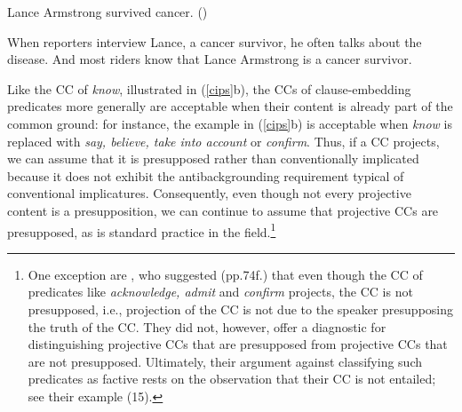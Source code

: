 \documentclass[11pt,fleqn]{article}
\def\infelic{{\leavevmode\llap{\#}}}
\newcommand{\6}{\mbox{$[\hspace*{-.6mm}[$}}
\newcommand{\9}{\mbox{$]\hspace*{-.6mm}]$}}
\begin{document}
\begin{exe}
\ex\label{cips} Lance Armstrong survived cancer. \hfill (\citealt[34]{potts05})
\begin{xlist}
\ex \infelic When reporters interview Lance, a cancer survivor, he often talks about the disease.
\ex And most riders know that Lance Armstrong is a cancer survivor.  
\end{xlist}
\end{exe}
Like the CC of {\em know}, illustrated in (\ref{cips}b), the CCs of clause-embedding predicates more generally are acceptable when their content is already part of the common ground: for instance, the example in (\ref{cips}b) is acceptable when {\em know} is replaced with {\em say, believe, take into account} or {\em confirm}. Thus, if a CC projects, we can assume that it is presupposed rather than conventionally implicated because it does not exhibit the antibackgrounding requirement typical of conventional implicatures. Consequently, even though not every projective content is a presupposition, we can continue to assume that projective CCs are presupposed, as is standard practice in the field.\footnote{One exception are \citet{anand-hacquard2014}, who suggested (pp.74f.) that even though the CC of predicates like {\em acknowledge, admit} and {\em confirm} projects, the CC is not presupposed, i.e., projection of the CC is not due to the speaker presupposing the truth of the CC. They did not, however, offer a diagnostic for distinguishing projective CCs that are presupposed from projective CCs that are not presupposed. Ultimately, their argument against classifying such predicates as factive rests on the observation that their CC is not entailed; see their example (15).}  


\end{document}
